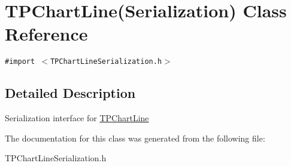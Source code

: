 \hypertarget{interface_t_p_chart_line_07_serialization_08}{
\section{TPChartLine(Serialization) Class Reference}
\label{interface_t_p_chart_line_07_serialization_08}
}
{\tt \#import $<$TPChartLineSerialization.h$>$}



\subsection{Detailed Description}
Serialization interface for \hyperlink{interface_t_p_chart_line}{TPChartLine} 

The documentation for this class was generated from the following file:\begin{CompactItemize}
\item 
TPChartLineSerialization.h\end{CompactItemize}
